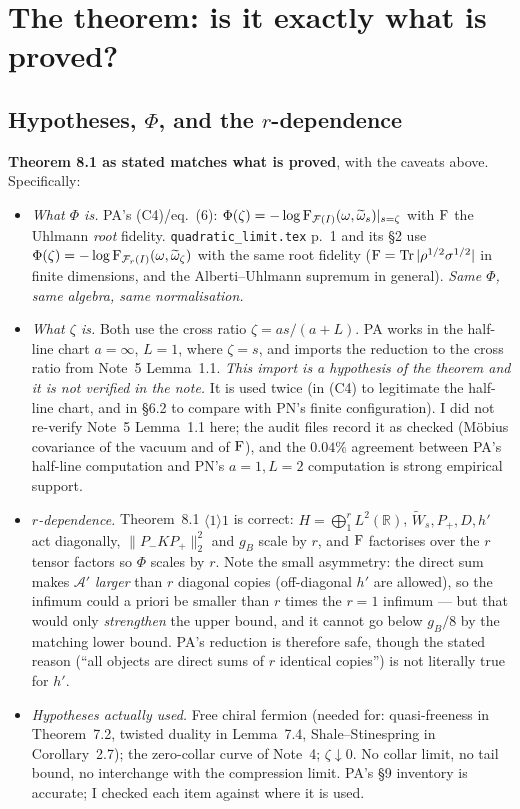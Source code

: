 \documentclass[11pt]{article}
\newcommand{\Wt}{\widetilde W}
\newcommand{\Pp}{P_+}\newcommand{\Pm}{P_-}
\providecommand{\norm}[1]{\lVert #1\rVert}\providecommand{\abs}[1]{\lvert #1\rvert}
\begin{document}
\section{The theorem: is it exactly what is proved?}\label{sec:thm}

\subsection{Hypotheses, $\Phi$, and the $r$-dependence}
\textbf{Theorem 8.1 as stated matches what is proved}, with the caveats above.  Specifically:
\begin{itemize}[leftmargin=1.4em]
\item \emph{What $\Phi$ is.}  PA's (C4)/eq.~(6): $\Phi(\zeta)=-\log\operatorname{F}_{\mathcal F(I)}(\omega,
 \widetilde\omega_s)|_{s=\zeta}$ with $\operatorname{F}$ the Uhlmann \emph{root} fidelity.
 \texttt{quadratic\_limit.tex} p.~1 and its \S2 use $\Phi(\zeta)=-\log\operatorname{F}_{\mathcal F_r(I)}
 (\omega,\widetilde\omega_\zeta)$ with the same root fidelity ($\operatorname{F}=\operatorname{Tr}|\rho^{1/2}\sigma^{1/2}|$ in
 finite dimensions, and the Alberti--Uhlmann supremum in general).  \emph{Same $\Phi$, same
 algebra, same normalisation.}
\item \emph{What $\zeta$ is.}  Both use the cross ratio $\zeta=as/(a+L)$.  PA works in the half-line
 chart $a=\infty$, $L=1$, where $\zeta=s$, and imports the reduction to the cross ratio from Note~5
 Lemma~1.1.  \emph{This import is a hypothesis of the theorem and it is not verified in the
 note.}  It is used twice (in (C4) to legitimate the half-line chart, and in \S6.2 to compare with
 PN's finite configuration).  I did not re-verify Note~5 Lemma~1.1 here; the audit files record it
 as checked (M\"obius covariance of the vacuum and of $\operatorname{F}$), and the $0.04\%$ agreement between
 PA's half-line computation and PN's $a=1,L=2$ computation is strong empirical support.
\item \emph{$r$-dependence.}  Theorem~8.1 $\langle1\rangle1$ is correct: $H=\bigoplus_1^rL^2(\mathbb
 R)$, $\Wt_s,\Pp,D,h'$ act diagonally, $\norm{\Pm K\Pp}_2^2$ and $g_B$ scale by $r$, and $\operatorname{F}$
 factorises over the $r$ tensor factors so $\Phi$ scales by $r$.  Note the small asymmetry: the
 direct sum makes $\mathcal A'$ \emph{larger} than $r$ diagonal copies (off-diagonal $h'$ are
 allowed), so the infimum could a priori be smaller than $r$ times the $r=1$ infimum --- but that
 would only \emph{strengthen} the upper bound, and it cannot go below $g_B/8$ by the matching lower
 bound.  PA's reduction is therefore safe, though the stated reason (``all objects are direct sums
 of $r$ identical copies'') is not literally true for $h'$.
\item \emph{Hypotheses actually used.}  Free chiral fermion (needed for: quasi-freeness in
 Theorem~7.2, twisted duality in Lemma~7.4, Shale--Stinespring in Corollary~2.7); the zero-collar
 curve of Note~4; $\zeta\downarrow0$.  No collar limit, no tail bound, no interchange with the
 compression limit.  PA's \S9 inventory is accurate; I checked each item against where it is used.
\end{itemize}
\end{document}
